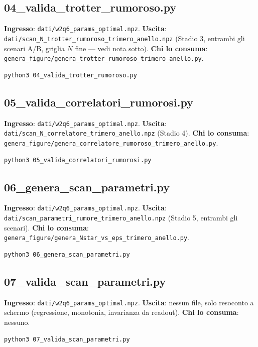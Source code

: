 \documentclass[11pt,a4paper]{article}
\begin{document}
\subsection{04\_valida\_trotter\_rumoroso.py}
\textbf{Ingresso}: \texttt{dati/w2q6\_params\_optimal.npz}.
\textbf{Uscita}:
\texttt{dati/scan\_N\_trotter\_\allowbreak rumoroso\_trimero\_anello.npz} (Stadio 3,
entrambi gli scenari A/B, griglia $N$ fine --- vedi nota sotto).
\textbf{Chi lo consuma}:
\texttt{genera\_figure/\allowbreak genera\_trotter\_\allowbreak rumoroso\_trimero\_anello.py}.
\begin{verbatim}
python3 04_valida_trotter_rumoroso.py
\end{verbatim}

\subsection{05\_valida\_correlatori\_rumorosi.py}
\textbf{Ingresso}: \texttt{dati/w2q6\_params\_optimal.npz}.
\textbf{Uscita}: \texttt{dati/scan\_N\_\allowbreak correlatore\_trimero\_anello.npz}
(Stadio 4). \textbf{Chi lo consuma}:
\texttt{genera\_figure/\allowbreak genera\_correlatore\_\allowbreak rumoroso\_trimero\_anello.py}.
\begin{verbatim}
python3 05_valida_correlatori_rumorosi.py
\end{verbatim}

\subsection{06\_genera\_scan\_parametri.py}
\textbf{Ingresso}: \texttt{dati/w2q6\_params\_optimal.npz}.
\textbf{Uscita}:
\texttt{dati/scan\_parametri\_\allowbreak rumore\_trimero\_anello.npz} (Stadio 5,
entrambi gli scenari). \textbf{Chi lo consuma}:
\texttt{genera\_figure/\allowbreak genera\_Nstar\_vs\_eps\_\allowbreak trimero\_anello.py}.
\begin{verbatim}
python3 06_genera_scan_parametri.py
\end{verbatim}

\subsection{07\_valida\_scan\_parametri.py}
\textbf{Ingresso}: \texttt{dati/w2q6\_params\_optimal.npz}.
\textbf{Uscita}: nessun file, solo resoconto a schermo (regressione,
monotonia, invarianza da readout). \textbf{Chi lo consuma}: nessuno.
\begin{verbatim}
python3 07_valida_scan_parametri.py
\end{verbatim}
\end{document}

